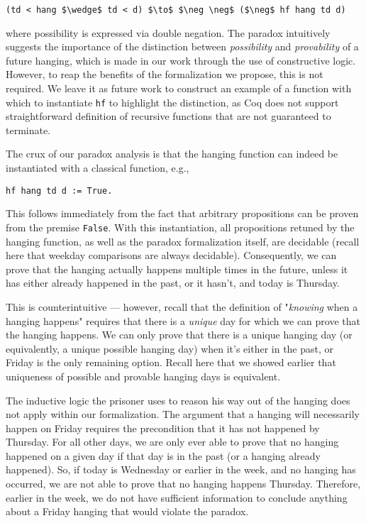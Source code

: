 \documentclass[runningheads]{llncs}
\begin{document}
\begin{lstlisting}[mathescape=true]
    (td < hang $\wedge$ td < d) $\to$ $\neg \neg$ ($\neg$ hf hang td d)
\end{lstlisting}

where possibility is expressed via double negation. The paradox intuitively
suggests the importance of the distinction between \emph{possibility} and \emph{provability}
of a future hanging, which is made in our work through the use of constructive
logic. However, to reap the benefits of the formalization we propose, this is
not required.
We leave it as future work to construct an example of a
function with which to instantiate {\tt hf} to highlight the distinction,
as Coq does not support straightforward definition of recursive functions that are
not guaranteed to terminate.

The crux of our paradox analysis
is that the hanging function can indeed be instantiated with a classical
function, e.g.,

\begin{lstlisting}[mathescape=true]
    hf hang td d := True.
\end{lstlisting}

This follows immediately from the fact that arbitrary propositions can be proven
from the premise {\tt False}. With this instantiation, all propositions
retuned by the hanging function, as well as the paradox formalization itself,
are decidable (recall here that weekday comparisons are always decidable).
Consequently, we can prove that the hanging actually happens
multiple times in the future, unless it has either already happened in the past,
or it hasn't, and today is Thursday.

This is counterintuitive --- however, recall that the
definition of "\emph{knowing} when a hanging happens" requires that there
is a \emph{unique}
day for which we can prove that the hanging happens. We can only prove that
there is a unique hanging day (or equivalently, a unique possible hanging day)
when it's either in the past, or Friday is the only remaining option.
Recall here that we showed earlier that uniqueness of possible and provable
hanging days is equivalent.

The inductive logic the prisoner uses to reason his way out of the hanging does
not apply within our formalization.
The argument that a hanging will necessarily happen on Friday requires the
precondition that it has not happened by Thursday. For all other days,
we are only ever able to prove
that no hanging happened on a given day if that day is in the past (or a hanging
already happened). So, if today is Wednesday or earlier
in the week, and no hanging has occurred, we are not able to prove that no hanging
happens Thursday. Therefore, earlier in the week, we do not have sufficient
information to conclude
anything about a Friday hanging that would violate the paradox.
\end{document}
